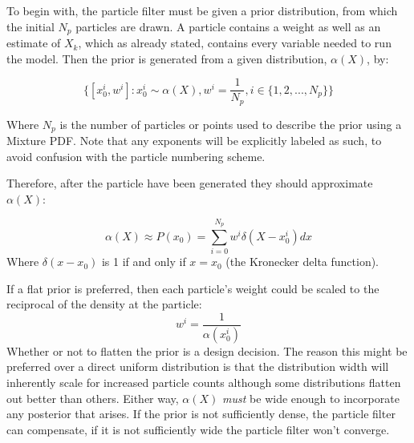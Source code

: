 To begin with, the particle filter must be given a prior distribution, from
which the initial $N_p$ particles are drawn. A particle contains a weight
as well as an estimate of $X_k$, which as already stated, contains every
variable needed to run the model. Then the prior is generated from a 
given distribution, $\alpha(X)$, by:

\begin{equation}
\{[x^i_0,w^i] : x^i_0 \sim \alpha(X), w^i = \frac{1}{N_p}, i \in \{1, 2, ... , N_p\} \}
\end{equation}

Where $N_p$ is the number of particles or points used to describe the prior 
using a Mixture PDF. 
Note that any exponents will be explicitly labeled as such, to avoid confusion with
the particle numbering scheme. 

Therefore, after the particle have been generated they should approximate $\alpha(X)$:

\begin{equation}
\alpha(X) \approx P(x_0) = \sum_{i=0}^{N_p} w^i\delta(X - x^i_0 ) dx
\end{equation}
Where $\delta(x-x_0)$ is 1 if and only if $x = x_0$ (the Kronecker delta function).

If a flat prior is 
preferred, then each particle's weight could be scaled to the reciprocal of the
density at the particle: 
\begin{equation}
w^i = \frac{1}{\alpha(x^i_0)}
\end{equation}
Whether or not to flatten the prior is a design decision. The reason this might 
be preferred over a direct
uniform distribution is that the distribution width will inherently scale 
for increased particle counts although some distributions
flatten out better than others. Either way, $\alpha(X)$ \emph{must} be
wide enough to incorporate any posterior that arises. If the prior is
not sufficiently dense, the particle filter can compensate, if it is
not sufficiently wide the particle filter won't converge. 

%

